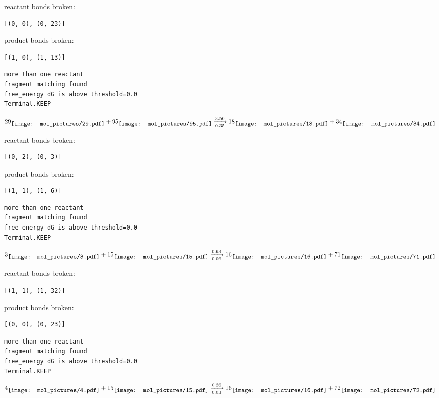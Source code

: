 \documentclass{article}
\begin{document}
reactant bonds broken:\begin{verbatim}
[(0, 0), (0, 23)]
\end{verbatim}
product bonds broken:\begin{verbatim}
[(1, 0), (1, 13)]
\end{verbatim}




\vspace{1cm}
\begin{verbatim}
more than one reactant
fragment matching found
free_energy dG is above threshold=0.0
Terminal.KEEP
\end{verbatim}
$$
29
\raisebox{-.5\height}{\texttt{[image: mol\_pictures/29.pdf]}}
+
95
\raisebox{-.5\height}{\texttt{[image: mol\_pictures/95.pdf]}}
\xrightarrow[0.35]{3.50}
18
\raisebox{-.5\height}{\texttt{[image: mol\_pictures/18.pdf]}}
+
34
\raisebox{-.5\height}{\texttt{[image: mol\_pictures/34.pdf]}}
$$


reactant bonds broken:\begin{verbatim}
[(0, 2), (0, 3)]
\end{verbatim}
product bonds broken:\begin{verbatim}
[(1, 1), (1, 6)]
\end{verbatim}




\vspace{1cm}
\begin{verbatim}
more than one reactant
fragment matching found
free_energy dG is above threshold=0.0
Terminal.KEEP
\end{verbatim}
$$
3
\raisebox{-.5\height}{\texttt{[image: mol\_pictures/3.pdf]}}
+
15
\raisebox{-.5\height}{\texttt{[image: mol\_pictures/15.pdf]}}
\xrightarrow[0.06]{0.63}
16
\raisebox{-.5\height}{\texttt{[image: mol\_pictures/16.pdf]}}
+
71
\raisebox{-.5\height}{\texttt{[image: mol\_pictures/71.pdf]}}
$$


reactant bonds broken:\begin{verbatim}
[(1, 1), (1, 32)]
\end{verbatim}
product bonds broken:\begin{verbatim}
[(0, 0), (0, 23)]
\end{verbatim}




\vspace{1cm}
\begin{verbatim}
more than one reactant
fragment matching found
free_energy dG is above threshold=0.0
Terminal.KEEP
\end{verbatim}
$$
4
\raisebox{-.5\height}{\texttt{[image: mol\_pictures/4.pdf]}}
+
15
\raisebox{-.5\height}{\texttt{[image: mol\_pictures/15.pdf]}}
\xrightarrow[0.03]{0.26}
16
\raisebox{-.5\height}{\texttt{[image: mol\_pictures/16.pdf]}}
+
72
\raisebox{-.5\height}{\texttt{[image: mol\_pictures/72.pdf]}}
$$
\end{document}

